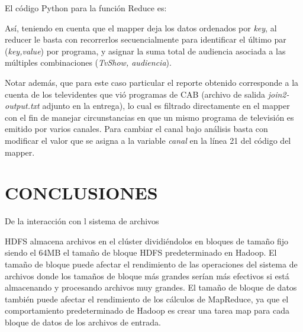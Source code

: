 \documentclass[letterpaper, 10 pt, conference]{ieeeconf}  %
\begin{document}
El código Python para la función Reduce es:



\noindent Así, teniendo en cuenta que el mapper deja los datos ordenados por \textit{key}, al reducer le basta con recorrerlos secuencialmente para identificar el último par (\textit{key,value}) por programa, y asignar la suma total de audiencia asociada a las múltiples combinaciones (\textit{TvShow, audiencia}).

Notar además, que para este caso particular el reporte obtenido corresponde a la cuenta de los televidentes que vió programas de CAB (archivo de salida \textit{join2-output.txt} adjunto en la entrega), lo cual es filtrado directamente en el mapper con el fin de manejar circunstancias en que un mismo programa de televisión es emitido por varios canales. Para cambiar el canal bajo análisis basta con modificar el valor que se asigna a la variable \textit{canal} en la línea 21 del código del mapper.  

\section{CONCLUSIONES}

De la interacción con l sistema de archivos



HDFS almacena archivos en el clúster dividiéndolos en bloques de tamaño fijo siendo el 64MB el tamaño de bloque HDFS predeterminado en Hadoop. El tamaño de bloque puede afectar el rendimiento de las operaciones del sistema de archivos donde los tamaños de bloque más grandes serían más efectivos si está almacenando y procesando archivos muy grandes. El tamaño de bloque de datos también puede afectar el rendimiento de los cálculos de MapReduce, ya que el comportamiento predeterminado de Hadoop es crear una tarea map para cada bloque de datos de los archivos de entrada.


\addtolength{\textheight}{-12cm}   %


\begin{thebibliography}{99}






\end{thebibliography}
\end{document}

